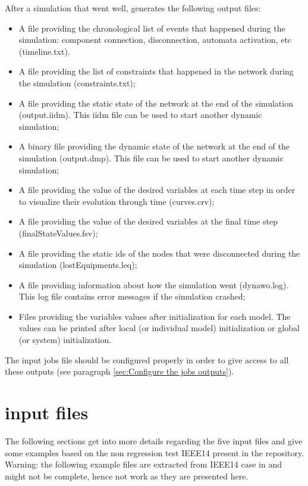 \documentclass[a4paper, 12pt]{report}
\begin{document}
After a simulation that went well, \Dynawo generates the following output files:
\begin{itemize}
\item A file providing the chronological list of events that happened during the simulation: component connection, disconnection, automata activation, etc (timeline.txt).
\item A file providing the list of constraints that happened in the network during the simulation (constraints.txt);
\item A file providing the static state of the network at the end of the simulation (output.iidm). This iidm file can be used to start another dynamic simulation;
\item A binary file providing the dynamic state of the network at the end of the simulation (output.dmp). This file can be used to start another dynamic simulation;
\item A file providing the value of the desired variables at each time step in order to visualize their evolution through time (curves.crv);
\item A file providing the value of the desired variables at the final time step (finalStateValues.fsv);
\item A file providing the static ids of the nodes that were disconnected during the simulation (lostEquipments.leq);
\item A file providing information about how the simulation went (dynawo.log). This log file contains error messages if the simulation crashed;
\item Files providing the variables values after initialization for each model. The values can be printed after local (or individual model) initialization or global (or system) initialization.
\end{itemize}

The input jobs file should be configured properly in order to give access to all these outputs (see paragraph \ref{sec:Configure the jobs outputs}).

\section[Dynawo input files]{\Dynawo input files}

The following sections get into more details regarding the five input files and give some examples based on the non regression test IEEE14 present in the \Dynawo repository. \\
Warning: the following example files are extracted from IEEE14 case in \Dynawo and might not be complete, hence not work as they are presented here.
\end{document}
